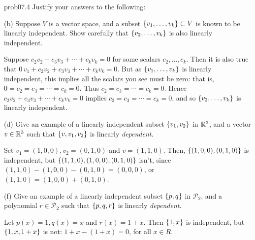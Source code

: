 \begin{sol}{prob07.4} Justify your answers to the following:\medskip 


(b) Suppose $V$ is a vector space, and a   subset $\{v_1, \dots , v_k \}\subset V$ is known to be linearly independent. Show carefully that $ \{v_2, \dots , v_k \}$ is also linearly independent.

\soln Suppose $c_2v_2 +c_3 v_3+ \cdots + c_k v_k=0$ for some scalars $c_2, \dots , c_k$. Then it is also true that $0\, v_1 +c_2v_2 +c_3 v_3+ \cdots + c_k v_k=0$. But as $\{v_1, \dots , v_k \}$ is linearly independent, this implies all the scalars you see must be zero: that is, $0=c_2=c_3=\cdots = c_k=0$. Thus $c_2=c_3=\cdots = c_k=0$. Hence $c_2v_2 +c_3 v_3+ \cdots + c_k v_k=0$ implies $c_2=c_3=\cdots = c_k=0$, and so $\{v_2, \dots , v_k \}$ is linearly independent.

\medskip
 

(d) Give an example of a linearly independent subset $\{v_1, v_2 \}$ in $\mathbb{R}^3$, and a vector $v\in  \mathbb{R}^3$ such that $\{v, v_1, v_2 \}$ is  linearly {\it dependent}.

\soln Set $v_1=(1,0,0), v_2=(0,1,0)$ and $v=(1,1,0)$. Then, $\{(1,0,0), (0,1,0) \}$ is independent, but $\{(1,1,0), (1,0,0), (0,1,0) \}$ isn't, since $ (1,1,0)- (1,0,0)-(0,1,0)=(0,0,0)$, or $(1,1,0)= (1,0,0)+(0,1,0)$.

\medskip

(f) Give an example of a linearly independent subset $\{p, q \}$ in $\mathcal P_2$, and a polynomial $r\in  \mathcal P_2$ such that $\{p, q,r \}$ is   linearly {\it dependent}.

\soln Let $p(x)=1, q(x)=x$ and $r(x)=1+x$. Then $\{1, x \}$ is independent, but $\{1, x, 1+x \}$ is not: $1 + x -(1+x)=0$, for all $x\in R$.

\end{sol}



